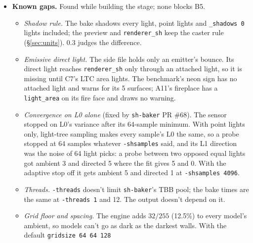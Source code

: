 \documentclass[11pt,a4paper]{article}
\begin{document}
\begin{itemize}
  The draft bakes 41939 points per bake, the other two 157346. The draft's lightmap figure also
  holds the difference between \texttt{-super 1} and \texttt{-super 2}. The final preset's 0.28 is
  at the 8-bit rounding floor ($1/\sqrt{12}\approx0.29$); its dark luxels (below byte 8) are at
  0.31, the pre-release's at 0.82. A 4096-sample \texttt{-super 2} light stage takes 187\,s. The
  stock check stays at the defaults (128 samples, \texttt{-super 1}). Hard lighting needs about
  4096 samples to converge smoothly (the day-time Sponza into two $2048^2$ pages took about 1.5
  hours), so \texttt{-shsamples 4096} remains a manual option. Path guiding and denoising
  (\texttt{sh-baker} Phases 10 and 11) attack this noise in 4.6.
\item \textbf{Known gaps.} Found while building the stage; none blocks B5.
  \begin{itemize}
  \item \emph{Shadow rule.} The bake shadows every light, point lights and \texttt{\_shadows 0}
    lights included; the preview and \texttt{renderer\_sh} keep the caster rule
    (§\ref{sec:units}). 0.3 judges the difference.
  \item \emph{Emissive direct light.} The side file holds only an emitter's bounce. Its direct
    light reaches \texttt{renderer\_sh} only through an attached light, so it is missing until
    C7's LTC area lights. The benchmark's neon sign has no attached light and warns for its 5
    surfaces; A11's fireplace has a \texttt{light\_area} on its fire face and draws no warning.
  \item \emph{Convergence on L0 alone} (fixed by \texttt{sh-baker} PR \#68). The sensor stopped on
    L0's variance after its 64-sample minimum. With point lights only, light-tree sampling makes
    every sample's L0 the same, so a probe stopped at 64 samples whatever \texttt{-shsamples} said,
    and its L1 direction was the noise of 64 light picks: a probe between two opposed equal lights
    got ambient 3 and directed 5 where the fit gives 5 and 0. With the adaptive stop off it gets
    ambient 5 and directed 1 at \texttt{-shsamples 4096}.
  \item \emph{Threads.} \texttt{-threads} doesn't limit \texttt{sh-baker}'s TBB pool; the bake
    times are the same at \texttt{-threads 1} and 12. The output doesn't depend on it.
  \item \emph{Grid floor and spacing.} The engine adds $32/255$ (12.5\%) to every model's ambient,
    so models can't go as dark as the darkest walls. With the default \texttt{gridsize 64 64 128}

\end{itemize}
\end{itemize}
\end{document}
